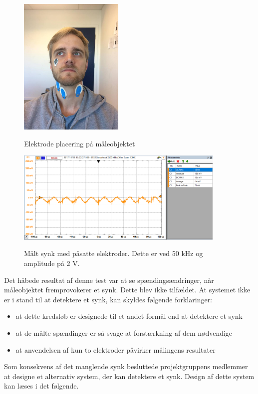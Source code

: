 \begin{figure}[H]
\centering
{\includegraphics[width=5cm]
{Figure/MartinElektroder}}
\caption{Elektrode placering på måleobjektet }
\label{fig:martin}
\end{figure}



   
\begin{figure}[H]
\centering
{\includegraphics[width=10cm]
{Figure/synk1}}
\caption{Målt synk med påsatte elektroder. Dette er ved 50 kHz og amplitude på 2 V.}
\label{fig:synk1}
\end{figure}


Det håbede resultat af denne test var at se spændingsændringer, når måleobjektet fremprovokerer et synk. Dette blev ikke tilfældet. At systemet ikke er i stand til at detektere et synk, kan skyldes følgende forklaringer:

\begin{itemize}
\item at dette kredsløb er designede til et andet formål end at detektere et synk
\item at de målte spændinger er så svage at forstærkning af dem nødvendige
\item at anvendelsen af kun to elektroder påvirker målingens resultater

\end{itemize} 

Som konsekvens af det manglende synk besluttede projektgruppens medlemmer at designe et alternativ system, der kan detektere et synk. Design af dette system kan læses i det følgende. 




